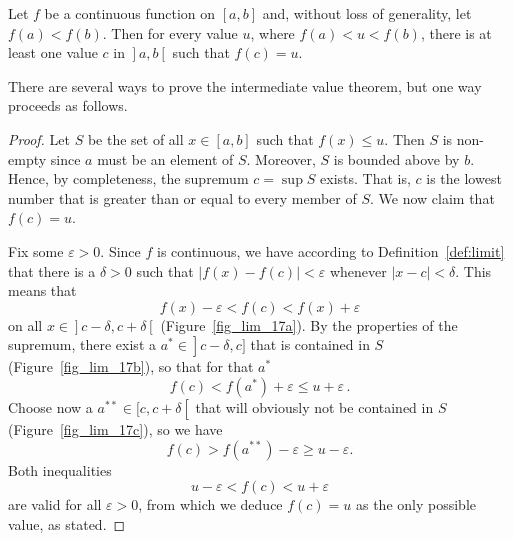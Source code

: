 \begin{theorem}\label{thm:IVT}
Let $f$ be a continuous function on $[a,b]$ and, without loss of generality, let $f(a) < f(b)$. Then for every value $u$, where $f(a) < u < f(b)$, there is at least one value $c$ in $\left.\right]a,b\left[\right.$ such that $f(c) = u$. 
\end{theorem}

\ifcalculus




\fi

\ifanalysis

There are several ways to prove the intermediate value theorem, but one way proceeds as follows.

\begin{proof}
Let $S$  be the set of all $ x\in [a,b]$ such that $f (x) \leq u$. Then $S$ is non-empty since $a$ must be an element of $S$. Moreover, $S$ is bounded above by $b$. Hence, by completeness, the supremum $ c=\sup S$ exists. That is, $c$ is the lowest number that is greater than or equal to every member of $S$. We now claim that $f(c) = u$.

Fix some $\varepsilon >0$. Since $f$ is continuous, we have according to Definition~\ref{def:limit} that there is a $\delta >0$ such that $\Big |f(x)-f(c)\Big |<\varepsilon $ whenever $|x-c |< \delta$. This means that
$$
f(x)-\varepsilon<f(c)<f(x)+\varepsilon
$$
on all $ x\in \left.\right]c-\delta ,c+\delta \left[\right.$ (Figure~\ref{fig_lim_17a}). By the properties of the supremum, there exist a  $a^{*}\in \left.\right]c-\delta ,c]$ that is contained in $S$ (Figure~\ref{fig_lim_17b}), so that for that $a^{*}$
$$
f(c)<f(a^{*})+\varepsilon \leq u+\varepsilon\,.
$$
Choose now a $a^{**}\in [c,c+\delta \left[\right.$ that will obviously not be contained in $S$ (Figure~\ref{fig_lim_17c}), so we have
$$
f(c)>f(a^{**})-\varepsilon \geq u-\varepsilon.
$$
Both inequalities
$$
 u-\varepsilon <f(c)<u+\varepsilon
 $$
are valid for all $\varepsilon >0$, from which we deduce $f(c)=u$ as the only possible value, as stated.
\end{proof}

